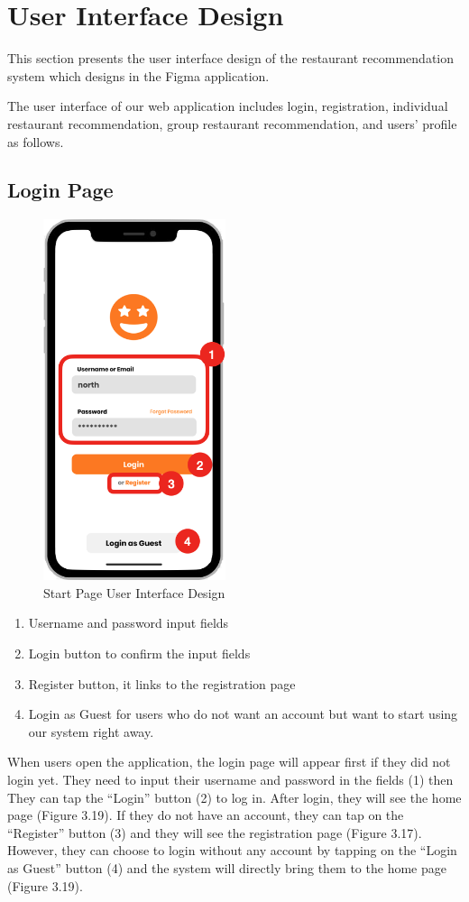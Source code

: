 \documentclass[12pt,oneside,openright,a4paper]{cpe-english-project}
\begin{document}
\section{User Interface Design}
This section presents the user interface design of the restaurant recommendation system which designs in the Figma application.

The user interface of our web application includes login, registration, individual restaurant recommendation, group restaurant recommendation, and users’ profile as follows.

\newpage
\subsection{Login Page}
\begin{figure}[!h]\centering
\includegraphics[height=300pt]{./images/3ui_StartPageUserInterfaceDesign.png}
\caption{Start Page User Interface Design}\label{fig:3ui_StartPageUserInterfaceDesign}
\end{figure}
\begin{enumerate}
\item Username and password input fields
\item Login button to confirm the input fields
\item Register button, it links to the registration page
\item Login as Guest for users who do not want an account but want to start using our system right away.
\end{enumerate}
When users open the application, the login page will appear first if they did not login yet. They need to input their username and password in the fields (1) then They can tap the “Login” button (2) to log in. After login, they will see the home page (Figure 3.19). If they do not have an account, they can tap on the “Register” button (3) and they will see the registration page (Figure 3.17). However, they can choose to login without any account by tapping on the “Login as Guest” button (4) and the system will directly bring them to the home page (Figure 3.19).
\newpage
\end{document}
